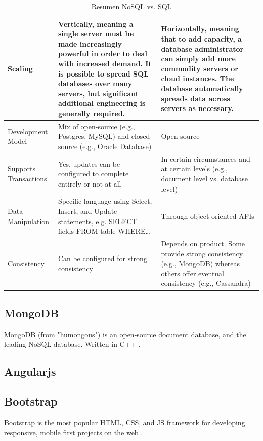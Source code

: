 \begin{table}[h!]
\begin{tabular}{ |L{0.1\paperwidth}|L{0.3\paperwidth}|L{0.3\paperwidth}|}
\\ \hline
	Scaling&
	Vertically, meaning a single server must be made increasingly powerful in order to deal with increased demand. It is possible to spread SQL databases over many servers, but significant additional engineering is generally required.&
	Horizontally, meaning that to add capacity, a database administrator can simply add more commodity servers or cloud instances. The database automatically spreads data across servers as necessary.
	
\\ \hline
	Development Model&
	Mix of open-source (e.g., Postgres, MySQL) and closed source (e.g., Oracle Database)&
	Open-source
	
\\ \hline
	Supports Transactions&
	Yes, updates can be configured to complete entirely or not at all&
	In certain circumstances and at certain levels (e.g., document level vs. database level)
	
\\ \hline
	Data Manipulation&
	Specific language using Select, Insert, and Update statements, e.g. SELECT fields FROM table WHERE…&
	Through object-oriented APIs

\\ \hline
	Consistency&
	Can be configured for strong consistency&
	Depends on product. Some provide strong consistency (e.g., MongoDB) whereas others offer eventual consistency (e.g., Cassandra)

\\ \hline
\end{tabular}
    \caption{ Resumen NoSQL vs. SQL}
    \label{tab:SQL_vs_noSQL_summary}
\end{table}


	\subsection{MongoDB}
	MongoDB (from "humongous") is an open-source document database, and the leading NoSQL database. Written in C++ \cite{technology_mongodb}.
	
	\subsection{Angularjs}
	\cite{technology_angularjs}
	
	\subsection{Bootstrap}
	Bootstrap is the most popular HTML, CSS, and JS framework for developing responsive, mobile first projects on the web \cite{technology_bootstrap}.
	
